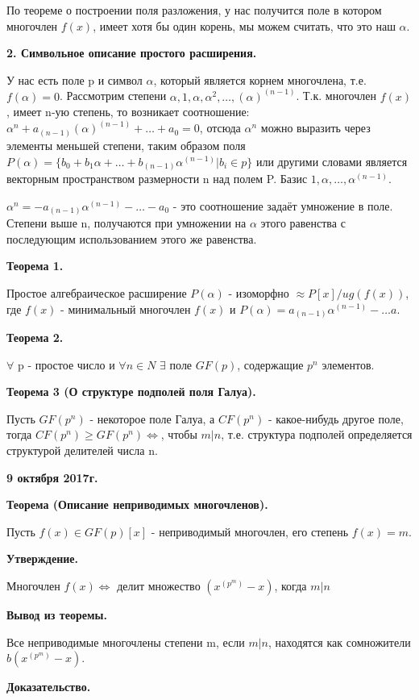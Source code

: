 \documentclass{article}
\begin{document}
По теореме о построении поля разложения, у нас получится поле в котором многочлен $f(x)$, имеет хотя бы один корень, мы можем считать, что это наш $\alpha$.

{\bf 2. Символьное описание простого расширения.}

У нас есть поле p и символ $\alpha$, который является корнем многочлена, т.е. $f(\alpha)=0$. Рассмотрим степени $\alpha, 1,\alpha, \alpha^2, \ldots, (\alpha)^(n-1)$. Т.к. многочлен $f(x)$, имеет n-ую степень, то возникает соотношение: $\alpha^n + a_(n-1) (\alpha)^(n-1) + \ldots + a_0=0$, отсюда $\alpha^n$ можно выразить через элементы меньшей степени, таким образом поля $P(\alpha)=\{b_0+b_1\alpha + \ldots + b_(n-1)\alpha^(n-1) | b_i \in p\}$ или другими словами является векторным пространством размерности n над полем P. Базис $1, \alpha, \ldots, \alpha^(n-1)$.

$\alpha^n=-a_(n-1)\alpha^(n-1)-\ldots - a_0$ - это соотношение задаёт умножение в поле. Степени выше n, получаются  при умножении на $\alpha$ этого равенства с последующим использованием этого же равенства.

{\bf Теорема 1.}

Простое алгебраическое расширение $P(\alpha)$ - изоморфно $\approx P[x]/ug(f(x))$, где $f(x)$ - минимальный многочлен $f(x)$ и $P(\alpha)=a_(n-1)\alpha^(n-1) - \ldots a$.

{\bf Теорема 2.}

$\forall$ p - простое число и $\forall n \in N$ $\exists$ поле $GF(p)$, содержащие $p^n$ элементов.

{\bf Теорема 3 (О структуре подполей поля Галуа).}

Пусть $GF(p^n)$ - некоторое поле Галуа, а $CF(p^n)$ - какое-нибудь другое поле, тогда $CF(p^n)\geq GF(p^n)\iff$, чтобы $m|n$, т.е. структура подполей определяется структурой делителей числа n.

\textbf {9 октября 2017г.}

{\bf Теорема (Описание неприводимых многочленов).}

Пусть $f(x) \in  GF(p) [x]$ - неприводимый многочлен, его степень $f(x)=m$.

{\bf Утверждение.}

Многочлен $f(x) \iff$ делит множество $(x^(p^m)-x)$, когда $m|n$

{\bf Вывод из теоремы.}

Все неприводимые многочлены степени m, если $m|n$, находятся как сомножители $b(x^(p^m)-x)$.

{\bf Доказательство.}
\end{document}
